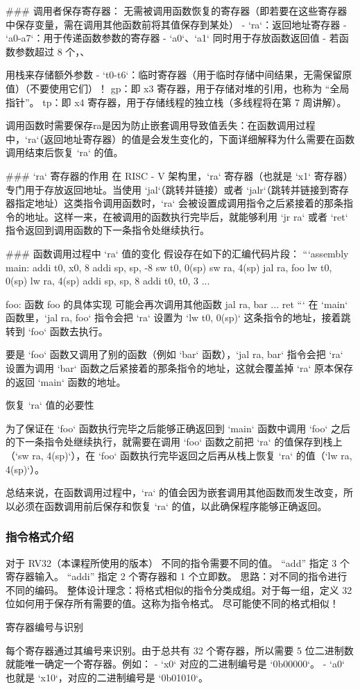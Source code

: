 \documentclass{ctexart}
\begin{document}
### 调用者保存寄存器：  
无需被调用函数恢复的寄存器（即若要在这些寄存器中保存变量，需在调用其他函数前将其值保存到某处）  
- `ra`：返回地址寄存器  
- `a0-a7`：用于传递函数参数的寄存器  
  - `a0`、`a1` 同时用于存放函数返回值  
  - 若函数参数超过 8 个，、\par
  用栈来存储额外参数  
- `t0-t6`：临时寄存器（用于临时存储中间结果，无需保留原值）（不要使用它们）！
gp：即 x3 寄存器，用于存储对堆的引用，也称为 “全局指针”。
tp：即 x4 寄存器，用于存储线程的独立栈（多线程将在第 7 周讲解）。\par
调用函数时需要保存ra是因为防止嵌套调用导致值丢失：在函数调用过程中，`ra`（返回地址寄存器）的值是会发生变化的，下面详细解释为什么需要在函数调用结束后恢复 `ra` 的值。

### `ra` 寄存器的作用
在 RISC - V 架构里，`ra` 寄存器（也就是 `x1` 寄存器）专门用于存放返回地址。当使用 `jal`（跳转并链接）或者 `jalr`（跳转并链接到寄存器指定地址）这类指令调用函数时，`ra` 会被设置成调用指令之后紧接着的那条指令的地址。这样一来，在被调用的函数执行完毕后，就能够利用 `jr ra` 或者 `ret` 指令返回到调用函数的下一条指令处继续执行。

### 函数调用过程中 `ra` 值的变化
假设存在如下的汇编代码片段：
```assembly
main:
    addi t0, x0, 8
    addi sp, sp, -8
    sw t0, 0(sp)
    sw ra, 4(sp)
    jal ra, foo
    lw t0, 0(sp)
    lw ra, 4(sp)
    addi sp, sp, 8
    addi t0, t0, 3
     ...

foo:
     函数 foo 的具体实现
     可能会再次调用其他函数
    jal ra, bar
     ...
    ret
```
在 `main` 函数里，`jal ra, foo` 指令会把 `ra` 设置为 `lw t0, 0(sp)` 这条指令的地址，接着跳转到 `foo` 函数去执行。

要是 `foo` 函数又调用了别的函数（例如 `bar` 函数），`jal ra, bar` 指令会把 `ra` 设置为调用 `bar` 函数之后紧接着的那条指令的地址，这就会覆盖掉 `ra` 原本保存的返回 `main` 函数的地址。
\par
 恢复 `ra` 值的必要性\par
为了保证在 `foo` 函数执行完毕之后能够正确返回到 `main` 函数中调用 `foo` 之后的下一条指令处继续执行，就需要在调用 `foo` 函数之前把 `ra` 的值保存到栈上（`sw ra, 4(sp)`），在 `foo` 函数执行完毕返回之后再从栈上恢复 `ra` 的值（`lw ra, 4(sp)`）。

总结来说，在函数调用过程中，`ra` 的值会因为嵌套调用其他函数而发生改变，所以必须在函数调用前后保存和恢复 `ra` 的值，以此确保程序能够正确返回。 \par
\subsubsection{指令格式介绍}
对于 RV32（本课程所使用的版本）
不同的指令需要不同的值。
“add” 指定 3 个寄存器输入。
“addi” 指定 2 个寄存器和 1 个立即数。
思路：对不同的指令进行不同的编码。
整体设计理念：将格式相似的指令分类成组。对于每一组，定义 32 位如何用于保存所有需要的值。这称为指令格式。
尽可能使不同的格式相似！\par
 寄存器编号与识别\par
每个寄存器通过其编号来识别。由于总共有 32 个寄存器，所以需要 5 位二进制数就能唯一确定一个寄存器。例如：
 - `x0` 对应的二进制编号是 `0b00000`。
 - `a0` 也就是 `x10`，对应的二进制编号是 `0b01010`。\par
\end{document}

